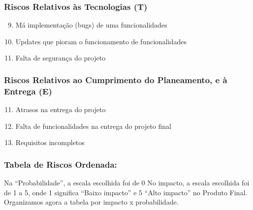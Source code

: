 \documentclass[12pt, a4paper, twoside]{report} %
\begin{document}
\subsubsection{Riscos Relativos às Tecnologias (T)}
\begin{enumerate}
\setcounter{enumi}{8}
\item Má implementação (bugs) de uma funcionalidades
\item Updates que pioram o funcionamento de funcionalidades
\item Falta de segurança do projeto
\end{enumerate}
\subsubsection{Riscos Relativos ao Cumprimento do Planeamento, e à Entrega (E)}
\begin{enumerate}
\setcounter{enumi}{10}
\item Atrasos na entrega do projeto
\item Falta de funcionalidades na entrega do projeto final
\item Requisitos incompletos
\end{enumerate}

\clearpage

\subsubsection{Tabela de Riscos Ordenada:}

\noindent Na “Probabilidade”, a escala escolhida foi de 0%
No impacto, a escala escolhida foi de 1 a 5, onde 1 significa
“Baixo impacto” e 5 “Alto impacto” no Produto Final.
\\
\noindent Organizamos agora a tabela por impacto x probabilidade.
\end{document}
